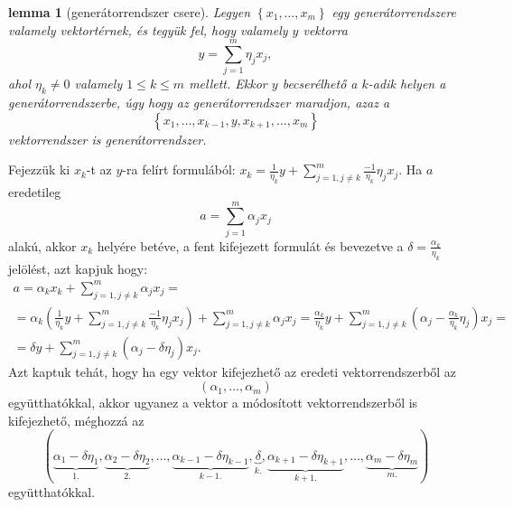 \documentclass[9pt, showtrims]{memoir}
\makeatletter
\renewenvironment{proof}[1][\proofname]
    {\par\pushQED{\qed}%
    \normalfont \topsep6\p@\@plus6\p@\relax
    \trivlist
    \item[\hskip\labelsep
        \itshape
    #1\@addpunct{:}]\ignorespaces}
    {\popQED\endtrivlist\@endpefalse}
\theoremstyle{plain}
\newtheorem{lemma}[proposition]{lemma}
\theoremstyle{remark}
\theoremstyle{definition}
\makeatother
\begin{document}
\begin{lemma}[generátorrendszer csere]\label{le:gencsere}
    Legyen $\left\{ x_1,\dots,x_m \right\}$ egy generátorrendszere valamely vektortérnek,
    és tegyük fel, hogy valamely $y$ vektorra
    \[
        y=\sum_{j=1}^m\eta_jx_j,
    \]
    ahol $\eta_k\neq 0$ valamely $1\leq k\leq m$ mellett. 
    Ekkor $y$ becserélhető a $k$-adik helyen a generátorrendszerbe, 
    úgy hogy az generátorrendszer maradjon, azaz a
    \[
        \left\{ x_1,\dots,x_{k-1},y,x_{k+1},\dots,x_m \right\}
    \]
    vektorrendszer is generátorrendszer.
\end{lemma}
\begin{proof}
    Fejezzük ki $x_k$-t az $y$-ra felírt formulából:
    \(
    x_k=\frac{1}{\eta_k}y+\sum_{j=1,j\neq k}^m\frac{-1}{\eta_k}\eta_jx_j.
    \)
    Ha $a$ eredetileg 
    \[
        a=\sum_{j=1}^m\alpha_jx_j
    \]
    alakú, akkor $x_k$ helyére betéve, a fent kifejezett formulát és bevezetve a 
    $\delta=\frac{\alpha_k}{\eta_k}$ jelölést, azt kapjuk hogy:
    \begin{multline*}
        a=\alpha_kx_k+\sum_{j=1,j\neq k}^m\alpha_jx_j=
        \\
        =
        \alpha_k
        \left( 
        \frac{1}{\eta_k}y+\sum_{j=1,j\neq k}^m\frac{-1}{\eta_k}\eta_jx_j
        \right)
        +\sum_{j=1,j\neq k}^m\alpha_jx_j
        =
        \frac{\alpha_k}{\eta_k}y+
        \sum_{j=1,j\neq k}^m\left( \alpha_j-\frac{\alpha_k}{\eta_k}\eta_j \right)x_j=
        \\
        =\delta y+
        \sum_{j=1,j\neq k}^m\left( \alpha_j-\delta\eta_j \right)x_j.
    \end{multline*}
    Azt kaptuk tehát, hogy ha egy vektor kifejezhető az eredeti vektorrendszerből az 
    \[
        \left( \alpha_1,\dots,\alpha_m \right) 
    \]
    együtthatókkal, akkor ugyanez a vektor a módosított vektorrendszerből is kifejezhető,
    méghozzá az 
    \[
        \left( 
        \underbrace{\alpha_1-\delta\eta_1}_{1.},
        \underbrace{\alpha_2-\delta\eta_2}_{2.},
        \dots,
        \underbrace{\alpha_{k-1}-\delta\eta_{k-1}}_{k-1.},
        \underbrace{\delta}_{k.},
        \underbrace{\alpha_{k+1}-\delta\eta_{k+1}}_{k+1.},\dots,
        \underbrace{\alpha_m-\delta\eta_m}_{m.}
        \right)
    \]
    együtthatókkal.
\end{proof}
\end{document}
